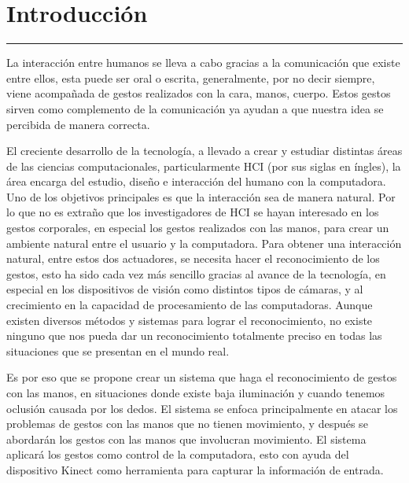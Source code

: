 \chapter{Introducci\'on}\label{capit:cap1}
\vspace{-2.0325ex}%
\noindent
\rule{\textwidth}{0.5pt}
\vspace{-5.5ex}%
\newcommand{\pushline}{\Indp}%

La interacci\'on entre humanos se lleva a cabo gracias a la comunicaci\'on  que existe entre ellos, esta puede ser oral o escrita, generalmente, por no decir siempre, viene acompa\~nada de gestos realizados con la cara, manos, cuerpo. 
Estos gestos sirven como complemento de la comunicaci\'on ya ayudan a que nuestra idea se percibida de manera correcta.


El creciente desarrollo de la tecnolog\'ia, a llevado  a crear y estudiar distintas \'areas de las ciencias computacionales, particularmente HCI (por sus siglas en \'ingles), la \'area encarga del estudio, dise\~no  e interacci\'on del humano con la computadora. 
Uno de los objetivos principales es que la interacci\'on sea de manera natural. 
Por lo que no es extra\~no que los investigadores de HCI se hayan interesado en los gestos corporales, en especial los gestos realizados con las manos, para crear un ambiente natural entre el usuario y la computadora. 
Para obtener una interacci\'on natural, entre estos dos actuadores, se necesita hacer el reconocimiento de los gestos, esto ha sido cada vez m\'as sencillo gracias al avance de la tecnolog\'ia, en especial en los dispositivos de visi\'on como distintos tipos de c\'amaras, y al crecimiento en la capacidad de procesamiento de las computadoras. 
Aunque existen diversos m\'etodos y sistemas para lograr el reconocimiento, no existe ninguno que nos pueda dar un reconocimiento totalmente preciso en todas las situaciones que se presentan en el mundo real.  


Es por eso que se propone crear un sistema que haga el reconocimiento de gestos con las manos, en situaciones donde existe baja iluminación y cuando tenemos oclusi\'on causada por los dedos. 
El sistema se enfoca principalmente en atacar los problemas de gestos con las manos que no tienen movimiento, y despu\'es se abordar\'an los gestos con las manos que involucran movimiento. El sistema aplicar\'a los gestos como control de la computadora, esto con ayuda del dispositivo Kinect como  herramienta para capturar la informaci\'on de entrada. 
  

